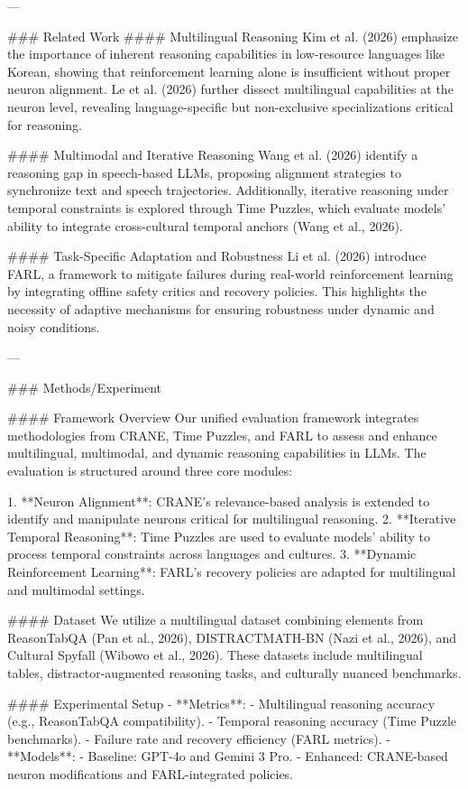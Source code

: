 ---

### Related Work
#### Multilingual Reasoning
Kim et al. (2026) emphasize the importance of inherent reasoning capabilities in low-resource languages like Korean, showing that reinforcement learning alone is insufficient without proper neuron alignment. Le et al. (2026) further dissect multilingual capabilities at the neuron level, revealing language-specific but non-exclusive specializations critical for reasoning.

#### Multimodal and Iterative Reasoning
Wang et al. (2026) identify a reasoning gap in speech-based LLMs, proposing alignment strategies to synchronize text and speech trajectories. Additionally, iterative reasoning under temporal constraints is explored through Time Puzzles, which evaluate models' ability to integrate cross-cultural temporal anchors (Wang et al., 2026).

#### Task-Specific Adaptation and Robustness
Li et al. (2026) introduce FARL, a framework to mitigate failures during real-world reinforcement learning by integrating offline safety critics and recovery policies. This highlights the necessity of adaptive mechanisms for ensuring robustness under dynamic and noisy conditions.

---

### Methods/Experiment

#### Framework Overview
Our unified evaluation framework integrates methodologies from CRANE, Time Puzzles, and FARL to assess and enhance multilingual, multimodal, and dynamic reasoning capabilities in LLMs. The evaluation is structured around three core modules: 

1. **Neuron Alignment**: CRANE's relevance-based analysis is extended to identify and manipulate neurons critical for multilingual reasoning.
2. **Iterative Temporal Reasoning**: Time Puzzles are used to evaluate models' ability to process temporal constraints across languages and cultures.
3. **Dynamic Reinforcement Learning**: FARL's recovery policies are adapted for multilingual and multimodal settings.

#### Dataset
We utilize a multilingual dataset combining elements from ReasonTabQA (Pan et al., 2026), DISTRACTMATH-BN (Nazi et al., 2026), and Cultural Spyfall (Wibowo et al., 2026). These datasets include multilingual tables, distractor-augmented reasoning tasks, and culturally nuanced benchmarks.

#### Experimental Setup
- **Metrics**:
  - Multilingual reasoning accuracy (e.g., ReasonTabQA compatibility).
  - Temporal reasoning accuracy (Time Puzzle benchmarks).
  - Failure rate and recovery efficiency (FARL metrics).
- **Models**:
  - Baseline: GPT-4o and Gemini 3 Pro.
  - Enhanced: CRANE-based neuron modifications and FARL-integrated policies.

